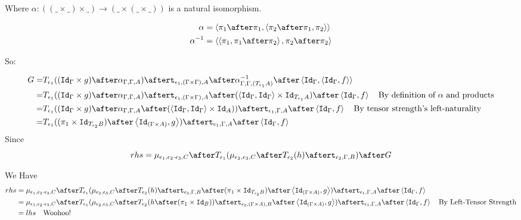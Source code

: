 \documentclass{report}
\begin{document}
    Where $\alpha: ((\_ \times \_) \times \_) \rightarrow (\_ \times (\_ \times \_))$ is a natural isomorphism.

    \begin{align}
        \alpha & = \pr{\p\after\p}{\pr{\pp\after\p}{\pp}}\\
        \alpha^{-1} &= \pr{\pr{\p}{\p\after\pp}}{\pp\after\pp}
    \end{align}

    So:

    \begin{equation}
        \begin{split}
            G = & \T{\e_1}{((\idg\times g)\after \alpha_{\G, \G, A})} \after \tstrength{\e_1}{(\G\times\G)}{A}\after\alpha^{-1}_{\G, \G, (\T{\e_1}{A})}\after\pr{\idg}{\pr{\idg}{f}} \\
            = & \T{\e_1}{((\idg\times g)\after \alpha_{\G, \G, A})} \after \tstrength{\e_1}{(\G\times\G)}{A}\after(\pr{\idg}{\idg}\times \Id{\T{\e_1}{A}})\after\pr{\idg}{f}\quad\text{By definition of $\alpha$ and products}\\
            = & \T{\e_1}{((\idg\times g)\after \alpha_{\G, \G, A}\after(\pr{\idg}{\idg}\times \Id{A}))}\after\tstrength{\e_1}{\G}{A}\after\pr{\idg}{f}\quad\text{By tensor strength's left-naturality}\\
            = & \T{\e_1}{((\p\times\Id{\T{\e_2}{B}})\after\pr{\Id{(\G\times A)}}{g})}\after\tstrength{\e_1}{\G}{A}\after\pr{\idg}{f}
        \end{split}
    \end{equation}
Since 
\begin{equation}
    rhs = \bind{\e_1}{\e_2\dot\e_3}{C}\after\T{\e_1}{(\bind{\e_2}{\e_3}{C}\after \T{\e_2}{(h)} \after \tstrength{\e_2}{\G}{B})}\after G
\end{equation}

We Have
\begin{equation}
    \begin{split}
        rhs ={} & \bind{\e_1}{\e_2\dot\e_3}{C}\after\T{\e_1}{(\bind{\e_2}{\e_3}{C}\after \T{\e_2}{(h)} \after \tstrength{\e_2}{\G}{B}\after(\p\times\Id{\T{\e_2}{B}})\after\pr{\Id{(\G\times A)}}{g})}\after\tstrength{\e_1}{\G}{A}\after\pr{\idg}{f}\\
        ={} & \bind{\e_1}{\e_2\dot\e_3}{C}\after\T{\e_1}{(\bind{\e_2}{\e_3}{C}\after \T{\e_2}{(h \after (\p\times\Id{B}))}\after\tstrength{\e_2}{(\G\times A)}{B}\after\pr{\Id{(\G\times A)}}{g})}\after\tstrength{\e_1}{\G}{A}\after\pr{\idg}{f}\quad\text{By Left-Tensor Strength}\\
        ={} & lhs \quad\text{Woohoo!}
    \end{split}
\end{equation}
\end{document}
